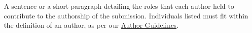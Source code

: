 \documentclass[charis,linguex]{glossa}
\begin{document}
A sentence or a short paragraph detailing the roles that each author held to contribute to the authorship of the submission.  Individuals listed must fit within the definition of an author, as per our \href{https://www.glossa-journal.org/site/author-guidelines/}{Author Guidelines}.

\nocite{*} %

\end{document}
